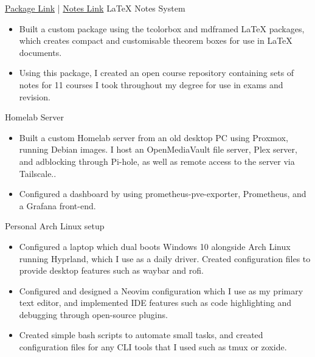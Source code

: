 \documentclass[../../cv-cs.tex]{subfiles}
\begin{document}
%
\cvlinkevent
{\href{https:www.github.com/leon0241/leon-latex-thmboxes}{Package Link} | \href{https:www.github.com/leon0241/leon-latex-notes}{Notes Link}}
{LaTeX Notes System}
{
    \begin{itemize}
	\item Built a custom package using the tcolorbox and mdframed LaTeX packages, which creates compact and customisable theorem boxes for use in LaTeX documents.
	\item Using this package, I created an open course repository containing sets of notes for 11 courses I took throughout my degree for use in exams and revision.
    \end{itemize}
}

\cvlinkevent
{}
{Homelab Server}
{
    \begin{itemize}
	\item Built a custom Homelab server from an old desktop PC using Proxmox, running Debian images. I host an OpenMediaVault file server, Plex server, and adblocking through Pi-hole, as well as remote access to the server via Tailscale..
	\item Configured a dashboard by using prometheus-pve-exporter, Prometheus, and a Grafana front-end.
    \end{itemize}
}

\cvlinkevent
{}
{Personal Arch Linux setup}
{
    \begin{itemize}
	\item Configured a laptop which dual boots Windows 10 alongside Arch Linux running Hyprland, which I use as a daily driver. Created configuration files to provide desktop features such as waybar and rofi.
	\item Configured and designed a Neovim configuration which I use as my primary text editor, and implemented IDE features such as code highlighting and debugging through open-source plugins.
	\item Created simple bash scripts to automate small tasks, and created configuration files for any CLI tools that I used such as tmux or zoxide.
    \end{itemize}
}
\end{document}

